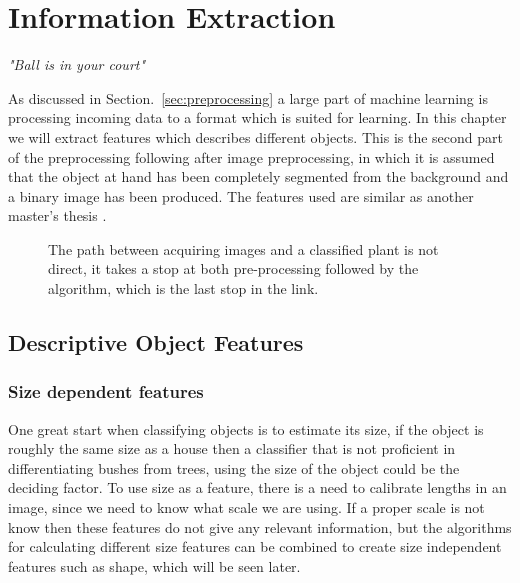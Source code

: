 \chapter{Information Extraction}
\begin{center}
\vspace{-6ex}
\textit{"Ball is in your court"}
\vspace{6ex}
\end{center}
\label{cha:Information_extraction}

As discussed in Section.~\ref{sec:preprocessing} a large part of machine learning is processing incoming data to a format which is suited for learning. In this chapter we will extract features which describes different objects. This is the second part of the preprocessing following after image preprocessing, in which it is assumed that the object at hand has been completely segmented from the background and a binary image has been produced. The features used are similar as another master's thesis \cite{WeedClassification}.

\begin{figure}
    \centering
    
    \caption{\label{fig:data_to_classification} The path between acquiring images and a classified plant is not direct, it takes a stop at both pre-processing followed by the algorithm, which is the last stop in the link.}
\end{figure}

\section{Descriptive Object Features}

\subsection{Size dependent features}

One great start when classifying objects is to estimate its size, if the object is roughly the same size as a house then a classifier that is not proficient in differentiating bushes from trees, using the size of the object could be the deciding factor. To use size as a feature, there is a need to calibrate lengths in an image, since we need to know what scale we are using. If a proper scale is not know then these features do not give any relevant information, but the algorithms for calculating different size features can be combined to create size independent features such as shape, which will be seen later.

